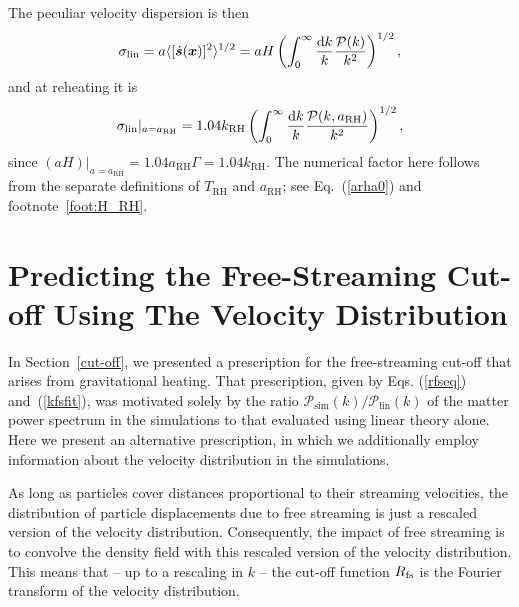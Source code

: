 \documentclass[a4paper,11pt]{article}
\newcommand{\rh}[1]{{#1}_{\mathrm{RH}}}
\newcommand{\rfs}{R_{\rm fs}}
\let\vec\bm%
\newcommand{\diff}{\ensuremath{\mathrm{d}}}
\begin{document}
The peculiar velocity dispersion is then
\begin{equation}
    \sigma_{\rm lin}=a\langle [\dot{\vec s}(\vec x)]^2\rangle^{1/2}
    = a H \left(\int_0^\infty\frac{\diff k}{k}
    \frac{\mathcal{P}(k)}{k^2}\right)^{1/2},
\end{equation}
and at reheating it is \begin{equation}
    \sigma_{\rm lin}|_{a=\rh{a}} = 1.04\rh{k} \left( \int_0^\infty \frac{\diff k}{k} \frac{\mathcal{P}(k,\rh{a})}{k^2}\right)^{1/2},
\end{equation} since $(aH)|_{a=\rh{a}} = 1.04\rh{a}\Gamma=1.04\rh{k}$. The numerical factor here follows from the separate definitions of $\rh{T}$ and $\rh{a}$; see Eq.~(\ref{arha0}) and footnote~\ref{foot:H_RH}.

\section{Predicting the Free-Streaming Cut-off Using The Velocity Distribution}
\label{velocity_distribution}

In Section~\ref{cut-off}, we presented a prescription for the free-streaming cut-off that arises from gravitational heating. That prescription, given by Eqs. (\ref{rfseq}) and~(\ref{kfsfit}), was motivated solely by the ratio $\mathcal{P}_\mathrm{sim}(k)/\mathcal{P}_\mathrm{lin}(k)$ of the matter power spectrum in the simulations to that evaluated using linear theory alone. Here we present an alternative prescription, in which we additionally employ information about the velocity distribution in the simulations.

As long as particles cover distances proportional to their streaming velocities, the distribution of particle displacements due to free streaming is just a rescaled version of the velocity distribution.
Consequently, the impact of free streaming is to convolve the density field with this rescaled version of the velocity distribution. This means that -- up to a rescaling in $k$ -- the cut-off function $\rfs$ is the Fourier transform of the velocity distribution.
\end{document}
